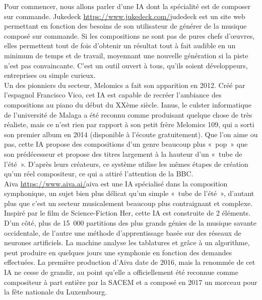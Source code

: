 \documentclass[12pt, a4paper]{article}
\begin{document}
        Pour commencer, nous allons parler d’une IA dont la spécialité est de composer sur commande. Jukedeck \url{https://www.jukedeck.com/}{judedeck} est un site web permettant en fonction des besoins de son utilisateur de générer de la musique composé sur commande. Si les compositions ne sont pas de pures chefs d’œuvres, elles permettent tout de fois d’obtenir un résultat tout à fait audible en un minimum de temps et de travail, moyennant une nouvelle génération si la piste n’est pas convaincante. C’est un outil ouvert à tous, qu’ils soient développeurs, entreprises ou simple curieux.\\
        
        Un des pionniers du secteur, Melomics a fait son apparition en 2012. Créé par l’espagnol Francisco Vico, cet IA est capable de recréer l’ambiance des compositions au piano du début du XXème siècle. Ianus, le culster informatique de l’université de Malaga a été reconnu comme produisant quelque chose de très réaliste, mais ce n’est rien par rapport à son petit frère Melomics 109, qui a sorti son premier album en 2014 (disponible à l’écoute gratuitement). Que l’on aime ou pas, cette IA propose des compositions d’un genre beaucoup plus « pop » que son prédécesseur et propose des titres largement à la hauteur d’un « tube de l’été ». D’après leurs créateurs, ce système utilise les mêmes étapes de création qu’un réel compositeur, ce qui a attiré l’attention de la BBC.\\
        
        Aiva \url{https://www.aiva.ai/}{aiva} est une IA spécialisé dans la composition symphonique, un sujet bien plus délicat qu’un simple « tube de l’été », d’autant plus que c’est un secteur musicalement beaucoup plus contraignant et complexe. Inspiré par le film de Science-Fiction Her, cette IA est construite de 2 éléments. D’un côté, plus de 15 000 partitions des plus grands génies de la musique savante occidentale, de l’autre une méthode d’apprentissage basée sur des réseaux de neurones artificiels. La machine analyse les tablatures et grâce à un algorithme, peut produire en quelques jours une symphonie en fonction des demandes effectuées. La première production d’Aiva date de 2016, mais la renommée de cet IA ne cesse de grandir, au point qu’elle a officiellement été reconnue comme compositeur à part entière par la SACEM et a composé en 2017 un morceau pour la fête nationale du Luxembourg.\\
        
\end{document}

